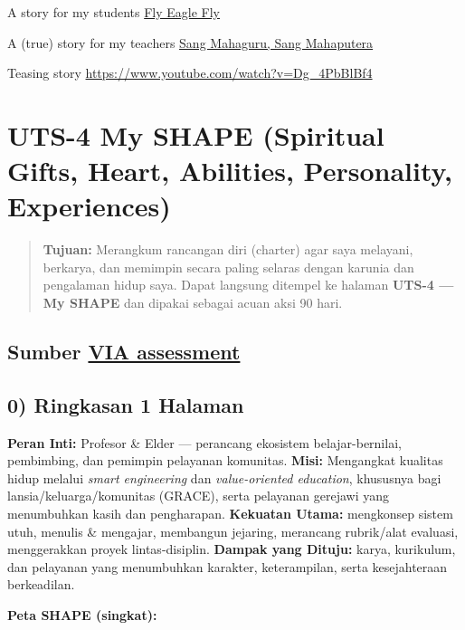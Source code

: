 \documentclass[
  letterpaper,
  DIV=11,
  numbers=noendperiod]{scrreprt}
\begin{document}
A story for my students
\href{https://azrl.wordpress.com/2008/04/21/fly-my-eagle-fly/}{Fly Eagle
Fly}

A (true) story for my teachers
\href{\%3Chttps://azrl.wordpress.com/2012/11/28/perginya-sang-mahaputera-dan-mahaguru-berkemeja-putih/}{Sang
Mahaguru, Sang Mahaputera}

Teasing story \url{https://www.youtube.com/watch?v=Dg_4PbBlBf4}


\chapter{UTS-4 My SHAPE (Spiritual Gifts, Heart, Abilities, Personality,
Experiences)}\label{uts-4-my-shape-spiritual-gifts-heart-abilities-personality-experiences}

\begin{quote}
\textbf{Tujuan:} Merangkum rancangan diri (charter) agar saya melayani,
berkarya, dan memimpin secara paling selaras dengan karunia dan
pengalaman hidup saya. Dapat langsung ditempel ke halaman \textbf{UTS-4
--- My SHAPE} dan dipakai sebagai acuan aksi 90 hari.
\end{quote}

\section{\texorpdfstring{Sumber
\href{StrengthsProfile-Armein-Langi.pdf}{VIA
assessment}}{Sumber VIA assessment}}\label{sumber-via-assessment}

\section{0) Ringkasan 1 Halaman}\label{ringkasan-1-halaman}

\textbf{Peran Inti:} Profesor \& Elder --- perancang ekosistem
belajar-bernilai, pembimbing, dan pemimpin pelayanan komunitas.
\textbf{Misi:} Mengangkat kualitas hidup melalui \emph{smart
engineering} dan \emph{value-oriented education}, khususnya bagi
lansia/keluarga/komunitas (GRACE), serta pelayanan gerejawi yang
menumbuhkan kasih dan pengharapan. \textbf{Kekuatan Utama:} mengkonsep
sistem utuh, menulis \& mengajar, membangun jejaring, merancang
rubrik/alat evaluasi, menggerakkan proyek lintas-disiplin.
\textbf{Dampak yang Dituju:} karya, kurikulum, dan pelayanan yang
menumbuhkan karakter, keterampilan, serta kesejahteraan berkeadilan.

\textbf{Peta SHAPE (singkat):}
\end{document}
